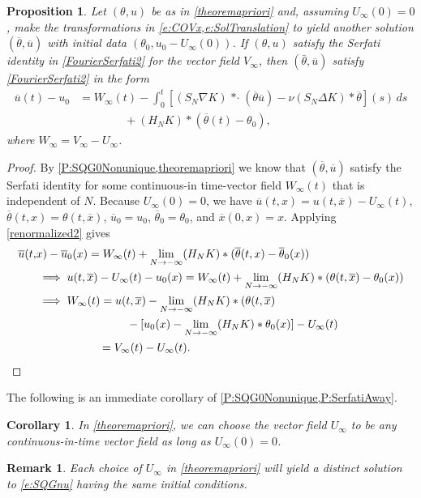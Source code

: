 \documentclass[11pt,reqno,xcolor=svgnames]{amsart}
\theoremstyle{plain}
\newtheorem{cor}[theorem]{Corollary}
\newtheorem{prop}[theorem]{Proposition}
\theoremstyle{definition}
\theoremstyle{plain}
\newtheorem{remark}[theorem]{Remark}
\theoremstyle{remark}
\newcommand{\iny}{\ensuremath{\infty}}
\newcommand{\grad}{\ensuremath{\nabla}}
\newcommand{\brac}[1]{\ensuremath{\left[ #1 \right]}}
\newcommand{\stardot}{{\mathop{* \cdot}}}
\newcommand{\ol}{\overline}
\newcommand{\ox}{{\ol{x}}}
\newcommand{\otheta}{\ol{\theta}}
\newcommand{\ou}{\ol{u}}
\begin{document}
\begin{prop}\label{P:SerfatiAway}
Let $(\theta, u)$ be as in \cref{theoremapriori} and, assuming $U_\iny(0) = 0$, make the transformations in \cref{e:COVx,e:SolTranslation} to yield another solution $(\otheta, \ou)$ with initial data $(\theta_0, u_0 - U_\iny(0))$. If $(\theta,u)$ satisfy the Serfati identity in \cref{FourierSerfati2} for the vector field $V_\iny$, then $(\bar{\theta}, \ou )$ satisfy \cref{FourierSerfati2} in the form
\begin{align*}
	\ou(t) - u_0
		&= W_\iny(t)
				- \int_0^t \brac{(S_N \grad K) \stardot (\otheta \ou)
						- \nu (S_N \Delta K) * \otheta}
						(s) \, ds \\
		&\qquad\qquad
				+ (H_N K) * (\otheta(t) - \theta_0),
\end{align*}
where $W_\iny = V_\iny - U_\iny$.
\end{prop}
\begin{proof}
    By \cref{P:SQG0Nonunique,theoremapriori} we know that $( \otheta,\ou)$ satisfy the Serfati identity for some continuous-in time-vector field $W_\iny(t)$ that is independent of $N$. Because $U_\iny(0) = 0$, we have $\ou(t, x) = u(t, \ox)-U_{\infty}(t)$, $\otheta(t, x) = \theta(t, \ox)$, $\ou_0 = u_0$, $\otheta_0 = \theta_0$, and $\ox(0, x) = x$. Applying \cref{renormalized2} gives
    \begin{align*}
        \ou(t, &x) - \ou_0(x)
            = W_\iny(t) + \lim_{N \to -\iny}
                (H_N K) * (\otheta(t, x) - \otheta_0(x)) \\
        &\implies u(t, \ox) - U_\iny(t) - u_0(x)
            = W_\iny(t) + \lim_{N \to -\iny}
                (H_N K) * (\theta(t, \ox) - \theta_0(x)) \\
        &\implies W_\iny(t)
            = u(t, \ox) - \lim_{N \to -\iny} (H_N K) * (\theta(t, \ox)  \\
            &\qquad\qquad\qquad\qquad
                - [u_0(x) - \lim_{N \to - \iny} (H_N K) * \theta_0(x)]
                    - U_\iny(t)
                \\
            &\qquad\qquad\quad\;\;
            = V_\iny(t) - U_\iny(t).
            \qedhere
         \end{align*}
\end{proof}

The following is an immediate corollary of \cref{P:SQG0Nonunique,P:SerfatiAway}.

\begin{cor}\label{C:SerfatiAway}
    In \cref{theoremapriori}, we can choose the vector field $U_{\infty}$ to be
    any continuous-in-time vector field as long as $U_{\infty}(0) = 0$.
\end{cor}
\begin{remark}
    Each choice of $U_{\infty}$ in \cref{theoremapriori} will yield a distinct solution to \cref{e:SQGnu} having the same initial conditions.
\end{remark}
\end{document}
